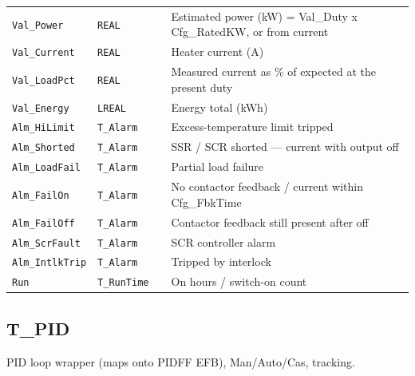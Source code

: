 \begin{small}
\begin{longtable}{@{}P{3.70cm}P{2.20cm}P{1.70cm}P{8.91cm}@{}}
\texttt{Val\_Power} & \texttt{REAL} &  & Estimated power (kW) = Val\_Duty x Cfg\_RatedKW, or from current \\
\texttt{Val\_Current} & \texttt{REAL} &  & Heater current (A) \\
\texttt{Val\_LoadPct} & \texttt{REAL} &  & Measured current as \% of expected at the present duty \\
\texttt{Val\_Energy} & \texttt{LREAL} &  & Energy total (kWh) \\
\texttt{Alm\_HiLimit} & \texttt{T\_Alarm} &  & Excess-temperature limit tripped \\
\texttt{Alm\_Shorted} & \texttt{T\_Alarm} &  & SSR /\allowbreak{} SCR shorted --- current with output off \\
\texttt{Alm\_LoadFail} & \texttt{T\_Alarm} &  & Partial load failure \\
\texttt{Alm\_FailOn} & \texttt{T\_Alarm} &  & No contactor feedback /\allowbreak{} current within Cfg\_FbkTime \\
\texttt{Alm\_FailOff} & \texttt{T\_Alarm} &  & Contactor feedback still present after off \\
\texttt{Alm\_ScrFault} & \texttt{T\_Alarm} &  & SCR controller alarm \\
\texttt{Alm\_IntlkTrip} & \texttt{T\_Alarm} &  & Tripped by interlock \\
\texttt{Run} & \texttt{T\_RunTime} &  & On hours /\allowbreak{} switch-on count \\
\bottomrule
\end{longtable}
\end{small}

\subsection{T\_PID}\label{sec:pclib-t-pid}

PID loop wrapper (maps onto PIDFF EFB), Man/\allowbreak{}Auto/\allowbreak{}Cas, tracking.

\par{}\par


